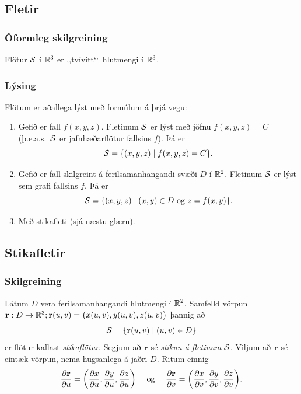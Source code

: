 \subsection{Fletir} 

\subsubsection{Óformleg skilgreining  \rtask{}}
Flötur $\cal S$ í ${\mathbb R}^3$ er
,,tvívítt\lq\lq\ hlutmengi í ${\mathbb R}^3$.   



\subsubsection{Lýsing  \rtask{}}
Flötum er aðallega lýst með formúlum á þrjá vegu:

\begin{enumerate}
 \item Gefið er fall $f(x,y,z)$.  Fletinum $\cal S$ er lýst með jöfnu 
$f(x,y,z)=C$ (þ.e.a.s.~$\cal S$ er jafnhæðarflötur fallsins $f$).  Þá
er
$${\cal S}=\{(x,y,z)\mid f(x,y,z)=C\}.$$

\item Gefið er fall skilgreint á ferilsamanhangandi 
svæði $D$ í ${\mathbb R}^2$.  Fletinum $\cal S$
er lýst sem grafi fallsins $f$.  Þá er
$${\cal S}=\{(x,y,z)\mid (x,y)\in D\mbox{ og } z=f(x,y)\}.$$

\item Með stikafleti (sjá næstu glæru). 
\end{enumerate}







\subsection{Stikafletir} 

\subsubsection{Skilgreining  \rtask{}}

Látum $D$ vera ferilsamanhangandi hlutmengi í ${\mathbb R}^2$.  Samfelld vörpun
$\mbox{${\bf r}$}:D\rightarrow {\mathbb R}^3; \mbox{${\bf r}$} (u,v)=\big(x(u,v), y(u,v), z(u,v)\big)$  
þannig að  
$${\cal S}=\{\mbox{${\bf r}$}(u,v)\mid (u,v)\in D\}$$
er flötur kallast {\em stikaflötur}.  Segjum að $\mbox{${\bf r}$}$ sé {\em stikun á
  fletinum} $\cal S$. 
Viljum að $\mbox{${\bf r}$}$ sé eintæk vörpun, nema hugsanlega á jaðri $D$.
Ritum einnig 
$$\frac{\partial \mbox{${\bf r}$}}{\partial u}=
\bigg(\frac{\partial x}{\partial u}, \frac{\partial y}{\partial u},
\frac{\partial z}{\partial u}\bigg)\quad\mbox{ og }\quad
\frac{\partial \mbox{${\bf r}$}}{\partial v}=
\bigg(\frac{\partial x}{\partial v}, \frac{\partial y}{\partial v},
\frac{\partial z}{\partial v}\bigg).$$





